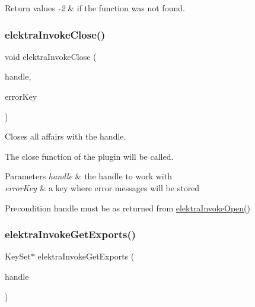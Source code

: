 \begin{DoxyRetVals}{Return values}
{\em -\/2} & if the function was not found. \\
\hline
\end{DoxyRetVals}
\mbox{\label{group__invoke_ga684a21daa0b3c20783c55184a9157b3b}} 
\subsubsection{\texorpdfstring{elektra\+Invoke\+Close()}{elektraInvokeClose()}}
{\footnotesize\ttfamily void elektra\+Invoke\+Close (\begin{DoxyParamCaption}\item[{Elektra\+Invoke\+Handle $\ast$}]{handle,  }\item[{Key $\ast$}]{error\+Key }\end{DoxyParamCaption})}



Closes all affairs with the handle. 

The close function of the plugin will be called.


\begin{DoxyParams}{Parameters}
{\em handle} & the handle to work with \\
\hline
{\em error\+Key} & a key where error messages will be stored\\
\hline
\end{DoxyParams}
\begin{DoxyPrecond}{Precondition}
handle must be as returned from \hyperlink{group__invoke_ga3eb20131e9a8fc9a6cebf126927c09bc}{elektra\+Invoke\+Open()} 
\end{DoxyPrecond}
\mbox{\label{group__invoke_ga6ab386aba337d8d3fd7978070d613efe}} 
\subsubsection{\texorpdfstring{elektra\+Invoke\+Get\+Exports()}{elektraInvokeGetExports()}}
{\footnotesize\ttfamily Key\+Set$\ast$ elektra\+Invoke\+Get\+Exports (\begin{DoxyParamCaption}\item[{Elektra\+Invoke\+Handle $\ast$}]{handle }\end{DoxyParamCaption})}



